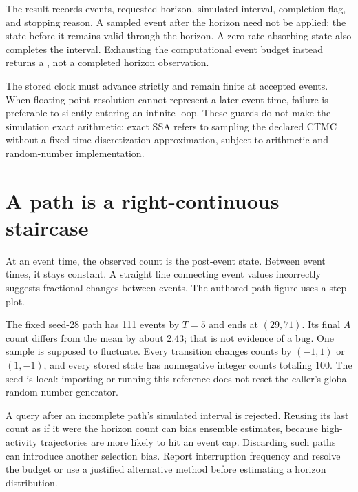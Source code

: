 The result records events, requested horizon, simulated interval, completion flag,
and stopping reason. A sampled event after the horizon need not be applied: the
state before it remains valid through the horizon. A zero-rate absorbing state
also completes the interval. Exhausting the computational event budget instead
returns a , not a completed horizon observation.

The stored clock must advance strictly and remain finite at accepted events.
When floating-point resolution cannot represent a later event time, failure is
preferable to silently entering an infinite loop. These guards do not make the
simulation exact arithmetic: exact SSA refers to sampling the declared CTMC
without a fixed time-discretization approximation, subject to arithmetic and
random-number implementation.

\section{A path is a right-continuous staircase}
At an event time, the observed count is the post-event state. Between event times,
it stays constant. A straight line connecting event values incorrectly suggests
fractional changes between events. The authored path figure uses a step plot.

The fixed seed-28 path has 111 events by $T=5$ and ends at $(29,71)$.
Its final $A$ count differs from the mean by about 2.43; that is not evidence of a
bug. One sample is supposed to fluctuate. Every transition changes counts by
$(-1,1)$ or $(1,-1)$, and every stored state has nonnegative integer counts totaling
100. The seed is local: importing or running this reference does not reset the
caller's global random-number generator.

A query after an incomplete path's simulated interval is rejected. Reusing its
last count as if it were the horizon count can bias ensemble estimates, because
high-activity trajectories are more likely to hit an event cap. Discarding such
paths can introduce another selection bias. Report interruption frequency and
resolve the budget or use a justified alternative method before estimating a
horizon distribution.

